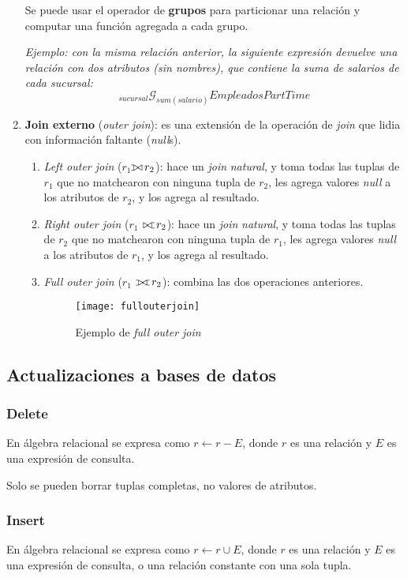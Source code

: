 \documentclass[a4paper, twoside]{article}
\def\ojoin{\setbox0=\hbox{$\bowtie$}%
  \rule[-.02ex]{.25em}{.4pt}\llap{\rule[\ht0]{.25em}{.4pt}}}
\def\leftouterjoin{\mathbin{\ojoin\mkern-5.8mu\bowtie}}
\def\rightouterjoin{\mathbin{\bowtie\mkern-5.8mu\ojoin}}
\def\fullouterjoin{\mathbin{\ojoin\mkern-5.8mu\bowtie\mkern-5.8mu\ojoin}}
\begin{document}
\begin{enumerate}
	Se puede usar el operador de \textbf{grupos}\textbf{\emph{ }}para particionar una relación y computar una función agregada a cada grupo.

	\emph{Ejemplo: con la misma relación anterior, la siguiente expresión devuelve una relación con dos atributos (sin nombres), que contiene la suma de salarios de cada sucursal:}
	\[
		_{sucursal}\mathcal{G}_{sum(salario)}EmpleadosPartTime
	\]

	\item \textbf{Join externo} (\emph{outer join}): es una extensión de la operación de \emph{join} que lidia con información faltante (\emph{null}s).
	\begin{enumerate}
		\item \emph{Left outer join} (\textbf{$r_{1}$$ $$\leftouterjoin\, r_{2}$}): hace un \emph{join} \emph{natural}, y toma todas las tuplas de $r_{1}$ que no matchearon con ninguna tupla de $r_{2}$, les agrega valores \emph{null} a los atributos de $r_{2}$, y los agrega al resultado.
		\item \emph{Right outer join} (\textbf{$r_{1}$ $\rightouterjoin\, r_{2}$}): hace un \emph{join} \emph{natural}, y toma todas las tuplas de $r_{2}$ que no matchearon con ninguna tupla de $r_{1}$, les agrega valores \emph{null} a los atributos de $r_{1}$, y los agrega al resultado.
		\item \emph{Full outer join} (\textbf{$r_{1}$ $\fullouterjoin\, r_{2}$}): combina las dos operaciones anteriores.
		\begin{figure}[H]
			\centering
			\texttt{[image: fullouterjoin]}
			\caption{Ejemplo de \emph{full outer join}}
		\end{figure}
	\end{enumerate}
\end{enumerate}

\subsection{Actualizaciones a bases de datos}
\subsubsection{Delete}
En álgebra relacional se expresa como $r\leftarrow r-E$, donde $r$ es una relación y $E$ es una expresión de consulta.

Solo se pueden borrar tuplas completas, no valores de atributos.

\subsubsection{Insert}
En álgebra relacional se expresa como $r\leftarrow r\cup E$, donde $r$ es una relación y $E$ es una expresión de consulta, o una relación constante con una sola tupla.
\end{document}
